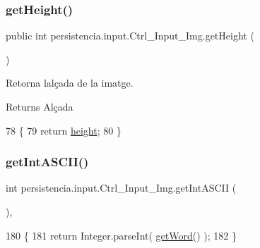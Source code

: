 \subsubsection{\texorpdfstring{get\+Height()}{getHeight()}}
{\footnotesize\ttfamily public int persistencia.\+input.\+Ctrl\+\_\+\+Input\+\_\+\+Img.\+get\+Height (\begin{DoxyParamCaption}{ }\end{DoxyParamCaption})\hspace{0.3cm}{\ttfamily [inline]}}



Retorna l\textquotesingle{}alçada de la imatge. 

\begin{DoxyReturn}{Returns}
Alçada 
\end{DoxyReturn}

\begin{DoxyCode}
78                            \{
79         \textcolor{keywordflow}{return} \hyperlink{classpersistencia_1_1input_1_1Ctrl__Input__Img_abc1dcc48714e9e74fb8ae0e0b81f91bf}{height};
80     \}
\end{DoxyCode}
\mbox{\label{classpersistencia_1_1input_1_1Ctrl__Input__Img_a430158ff229038ddc3476d406239f4cd}} 
\subsubsection{\texorpdfstring{get\+Int\+A\+S\+C\+I\+I()}{getIntASCII()}}
{\footnotesize\ttfamily int persistencia.\+input.\+Ctrl\+\_\+\+Input\+\_\+\+Img.\+get\+Int\+A\+S\+C\+II (\begin{DoxyParamCaption}{ }\end{DoxyParamCaption})\hspace{0.3cm}{\ttfamily [inline]}, {\ttfamily [private]}}


\begin{DoxyCode}
180                               \{
181         \textcolor{keywordflow}{return} Integer.parseInt( \hyperlink{classpersistencia_1_1input_1_1Ctrl__Input__Img_a17676e8616da5821ca2323da4691d240}{getWord}() );
182     \}
\end{DoxyCode}
\mbox{\label{classpersistencia_1_1input_1_1Ctrl__Input__Img_a53ec1b76b3fe590640ba6ed08adc2de2}} 
